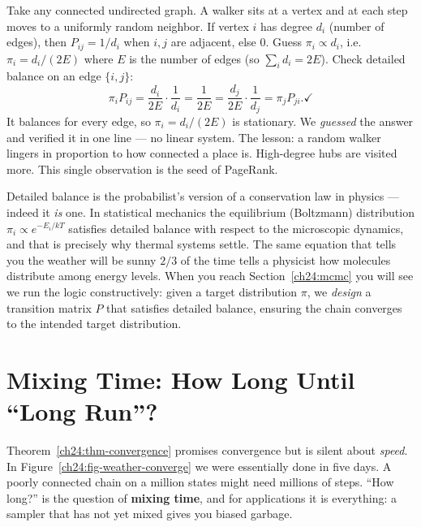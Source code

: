\begin{example}
\label{ch24:ex-graph-walk}
Take any connected undirected graph. A walker sits at a vertex and at each step
moves to a uniformly random neighbor. If vertex $i$ has degree $d_i$ (number of
edges), then $P_{ij} = 1/d_i$ when $i,j$ are adjacent, else $0$. Guess
$\pi_i \propto d_i$, i.e.\ $\pi_i = d_i / (2E)$ where $E$ is the number of edges
(so $\sum_i d_i = 2E$). Check detailed balance on an edge $\{i,j\}$:
\[
  \pi_i P_{ij} = \frac{d_i}{2E}\cdot\frac{1}{d_i} = \frac{1}{2E}
  = \frac{d_j}{2E}\cdot\frac{1}{d_j} = \pi_j P_{ji}. \checkmark
\]
It balances for every edge, so $\pi_i = d_i/(2E)$ is stationary. We \emph{guessed}
the answer and verified it in one line --- no linear system. The lesson: a random
walker lingers in proportion to how connected a place is. High-degree hubs are
visited more. This single observation is the seed of PageRank.
\end{example}

\begin{aestheticbox}
Detailed balance is the probabilist's version of a conservation law in physics ---
indeed it \emph{is} one. In statistical mechanics the equilibrium (Boltzmann)
distribution $\pi_i \propto e^{-E_i/kT}$ satisfies detailed balance with respect
to the microscopic dynamics, and that is precisely why thermal systems settle. The
same equation that tells you the weather will be sunny $2/3$ of the time tells a
physicist how molecules distribute among energy levels. When you reach
Section~\ref{ch24:mcmc} you will see we run the logic constructively: given a
target distribution $\pi$, we \emph{design} a transition matrix $P$ that satisfies detailed balance,
ensuring the chain converges to the intended target distribution.
\end{aestheticbox}

\section{Mixing Time: How Long Until ``Long Run''?}
\label{ch24:mixing}

Theorem~\ref{ch24:thm-convergence} promises convergence but is silent about
\emph{speed}. In Figure~\ref{ch24:fig-weather-converge} we were essentially done
in five days. A poorly connected chain on a million states might need millions of
steps. ``How long?'' is the question of \textbf{mixing time}, and for
applications it is everything: a sampler that has not yet mixed gives you biased
garbage.

